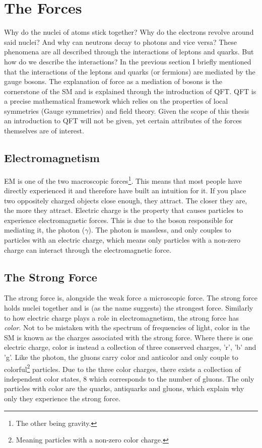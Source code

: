 \section{The Forces}
Why do the nuclei of atoms stick together? Why do the electrons revolve
around said nuclei? And why can neutrons decay to photons and vice versa? These phenomena 
are all described through the interactions of leptons and quarks. But how do we describe the 
interactions? In the previous section I briefly mentioned that the interactions of the leptons 
and quarks (or fermions) are mediated by the gauge bosons. The explanation of force as 
a mediation of bosons is the cornerstone of the \ac{SM} and is explained through 
the introduction of \ac{QFT}. \ac{QFT} is a precise mathematical framework which relies on the 
properties of local symmetries (Gauge symmetries) and field theory. Given the scope of this thesis
an introduction to \ac{QFT} will not be given, yet certain attributes of the forces themselves
are of interest. 
\subsection{Electromagnetism}
\acf{EM} is one of the two macroscopic forces\footnote{The other being gravity.}.
This means that most people have directly experienced it and therefore have built an intuition for
it. If you place two oppositely charged objects close enough, they attract. The closer they are, 
the more they attract. Electric charge is the property that causes particles to 
experience electromagnetic forces. This is due to the boson responsible for mediating it, 
the photon ($\gamma$). The photon is massless, and only couples to particles with an electric charge,
which means only particles with a non-zero charge can interact through the electromagnetic force.
\subsection{The Strong Force}
The strong force is, alongside the weak force a microscopic force. The strong force 
holds nuclei together and is (as the name suggests) the strongest force. Similarly to how electric 
charge plays a role in electromagnetism, the strong force has \emph{color}. Not to be mistaken 
with the spectrum of frequencies of light, color in the \ac{SM} is known as the charges 
associated with the strong force. Where there is one electric charge, color is instead a collection 
of three conserved charges, 'r', 'b' and 'g'. Like the photon, the gluons carry color and anticolor
and only couple to colorful\footnote{Meaning particles with a non-zero color charge.} particles. 
Due to the three color charges, there exists a collection of independent color states, 8 which 
corresponds to the number of gluons. The only particles with color are the quarks, antiquarks and gluons, which explain why 
only they experience the strong force. 
